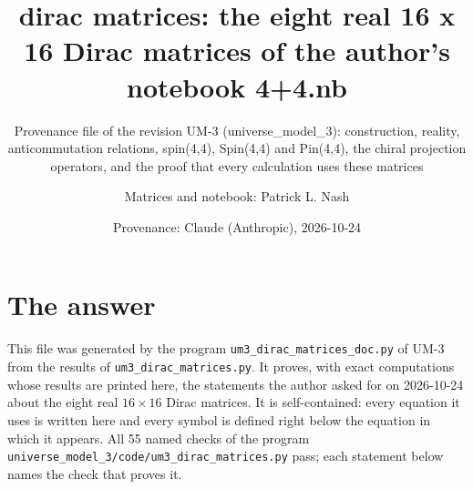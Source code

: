 \documentclass[
  10pt,
]{article}
\title{dirac matrices: the eight real 16 x 16 Dirac matrices of the
author's notebook 4+4.nb}
\subtitle{Provenance file of the revision UM-3 (universe\_model\_3):
construction, reality, anticommutation relations, spin(4,4), Spin(4,4)
and Pin(4,4), the chiral projection operators, and the proof that every
calculation uses these matrices}
\author{Matrices and notebook: Patrick L. Nash \and Provenance: Claude
(Anthropic), 2026-10-24}
\date{}
\begin{document}
\maketitle

{
\hypersetup{linkcolor=}
\setcounter{tocdepth}{3}
\tableofcontents
}
\hypertarget{the-answer}{%
\section{The answer}\label{the-answer}}

This file was generated by the program
\texttt{um3\_dirac\_matrices\_doc.py} of UM-3 from the results of
\texttt{um3\_dirac\_matrices.py}. It proves, with exact computations
whose results are printed here, the statements the author asked for on
2026-10-24 about the eight real \(16 \times 16\) Dirac matrices. It is
self-contained: every equation it uses is written here and every symbol
is defined right below the equation in which it appears. All 55 named
checks of the program
\texttt{universe\_model\_3/code/um3\_dirac\_matrices.py} pass; each
statement below names the check that proves it.
\end{document}
